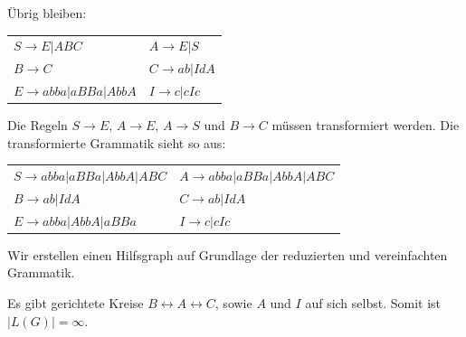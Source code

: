 \documentclass{article}
\begin{document}
Übrig bleiben:
\begin{center}
\begin{tabular}{ll}
$S \rightarrow E | ABC$            & $A \rightarrow E | S$ \\
$B \rightarrow C$                  & $C \rightarrow ab | IdA$ \\
$E \rightarrow abba | aBBa | AbbA$ & $I \rightarrow c | cIc$ \\
\end{tabular}
\end{center}
Die Regeln $S \rightarrow E$, $A \rightarrow E$, $A \rightarrow S$ und $B \rightarrow C$ müssen transformiert werden. Die transformierte Grammatik sieht so aus:
\begin{center}
\begin{tabular}{ll}
$S \rightarrow abba | aBBa | AbbA | ABC$ & $A \rightarrow abba | aBBa | AbbA | ABC$ \\
$B \rightarrow ab | IdA$                 & $C \rightarrow ab | IdA$ \\
$E \rightarrow abba | AbbA | aBBa$       & $I \rightarrow c | cIc$ \\
\end{tabular}
\end{center}

Wir erstellen einen Hilfsgraph auf Grundlage der reduzierten und vereinfachten Grammatik.
\begin{center}
\end{center}

Es gibt gerichtete Kreise $B \leftrightarrow A \leftrightarrow C$, sowie $A$ und $I$ auf sich selbst. Somit ist $|L(G)| = \infty$.
\end{document}
